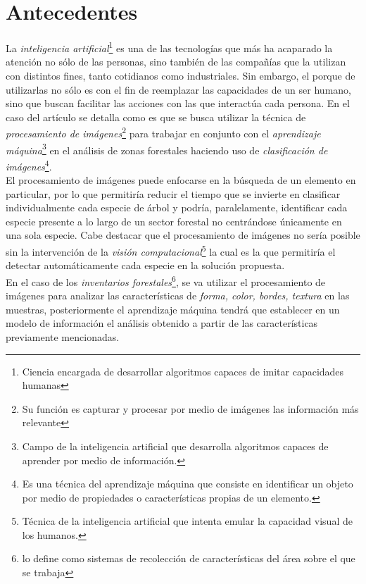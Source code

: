 \documentclass[review]{elsarticle}
\begin{document}
\section{Antecedentes}
La \emph{inteligencia artificial}\footnote{Ciencia encargada de desarrollar algoritmos capaces de imitar capacidades humanas} es una de las tecnologías que más ha acaparado la atención no sólo de las personas, sino también de las compañías que la utilizan con distintos fines, tanto cotidianos como industriales. Sin embargo, el porque de utilizarlas no sólo es con el fin de reemplazar las capacidades de un ser humano, sino que buscan facilitar las acciones con las que interactúa cada persona. En el caso del artículo se detalla como es que se busca utilizar la técnica de  \emph{procesamiento de imágenes}\footnote{Su función es capturar y procesar por medio de imágenes las información más relevante} para trabajar en conjunto con el \emph{aprendizaje máquina}\footnote{Campo de la inteligencia artificial que desarrolla algoritmos capaces de aprender por medio de información.} en el análisis de zonas forestales haciendo uso de \emph{clasificación de imágenes}\footnote{Es una técnica del aprendizaje máquina que consiste en identificar un objeto por medio de propiedades o características propias de un elemento.}.\\

El procesamiento de imágenes puede enfocarse en la búsqueda de un elemento en particular, por lo que permitiría reducir el tiempo que se invierte en clasificar individualmente cada especie de árbol y podría, paralelamente, identificar cada especie presente  a lo largo de un sector forestal no centrándose únicamente en una sola especie. Cabe destacar que el procesamiento de imágenes no sería posible sin la intervención de la \emph{visión computacional}\footnote{Técnica de la inteligencia artificial que intenta emular la capacidad visual de los humanos.} la cual es la que permitiría el detectar automáticamente cada especie en la solución propuesta.\\

En el caso de los \emph{inventarios forestales}\footnote{\citet{rf9} lo define como sistemas de recolección de características del área sobre el que se trabaja}, se va utilizar el procesamiento de imágenes para analizar las características de \textit{forma, color, bordes, textura} en las muestras, posteriormente el aprendizaje máquina tendrá que establecer en un modelo de información el análisis obtenido a partir de las características previamente mencionadas.
\end{document}
